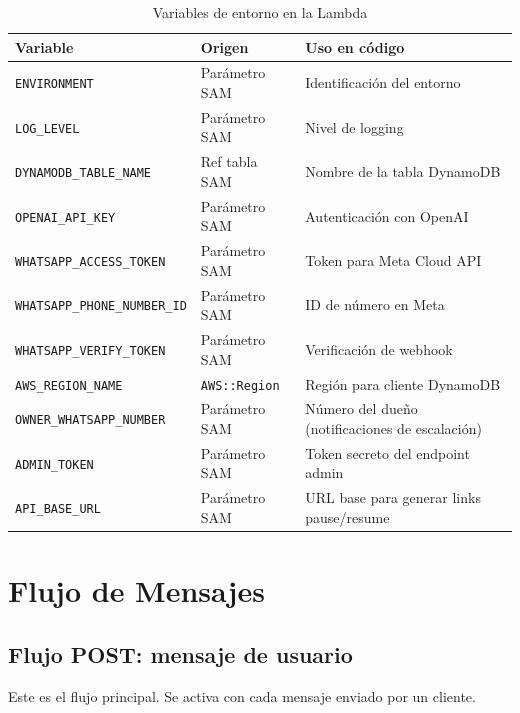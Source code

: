 \documentclass[12pt,a4paper]{article}
\begin{document}
\begin{table}[H]
\centering
\begin{tabular}{@{}lll@{}}
\toprule
\textbf{Variable} & \textbf{Origen} & \textbf{Uso en código} \\
\midrule
\texttt{ENVIRONMENT} & Parámetro SAM & Identificación del entorno \\
\texttt{LOG\_LEVEL} & Parámetro SAM & Nivel de logging \\
\texttt{DYNAMODB\_TABLE\_NAME} & Ref tabla SAM & Nombre de la tabla DynamoDB \\
\texttt{OPENAI\_API\_KEY} & Parámetro SAM & Autenticación con OpenAI \\
\texttt{WHATSAPP\_ACCESS\_TOKEN} & Parámetro SAM & Token para Meta Cloud API \\
\texttt{WHATSAPP\_PHONE\_NUMBER\_ID} & Parámetro SAM & ID de número en Meta \\
\texttt{WHATSAPP\_VERIFY\_TOKEN} & Parámetro SAM & Verificación de webhook \\
\texttt{AWS\_REGION\_NAME} & \texttt{AWS::Region} & Región para cliente DynamoDB \\
\texttt{OWNER\_WHATSAPP\_NUMBER} & Parámetro SAM & Número del dueño (notificaciones de escalación) \\
\texttt{ADMIN\_TOKEN} & Parámetro SAM & Token secreto del endpoint admin \\
\texttt{API\_BASE\_URL} & Parámetro SAM & URL base para generar links pause/resume \\
\bottomrule
\end{tabular}
\caption{Variables de entorno en la Lambda}
\end{table}

\section{Flujo de Mensajes}

\subsection{Flujo POST: mensaje de usuario}

Este es el flujo principal. Se activa con cada mensaje enviado por un cliente.
\end{document}
